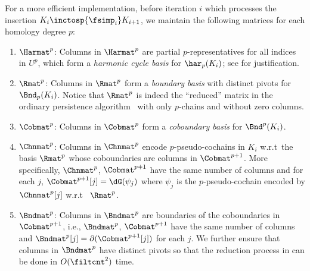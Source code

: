 For a more efficient implementation,
before  iteration $i$ which processes the insertion 
$K_{i}\inctosp{\fsimp_i} K_{i+1}$,
we maintain the following matrices
for each homology degree $p$:
\begin{enumerate}

    \item $\Harmat^{p}$: Columns in  $\Harmat^{p}$
    are
    partial $p$-representatives 
    for all indices in $U^p$,
 which
 form a \emph{harmonic cycle basis} for $\har_p(K_i)$;
 see  for justification.

\item $\Rmat^p$: Columns in $\Rmat^p$ form a \emph{boundary basis} with distinct pivots for $\Bnd_p(K_i)$.
Notice that $\Rmat^p$ is indeed the ``reduced'' matrix 
in the
ordinary persistence algorithm~\cite{cohen2006vines}
with only $p$-chains
and without zero columns.

\item $\Cobmat^p$: Columns in $\Cobmat^p$ form a \emph{coboundary basis}
for $\Bnd^p(K_i)$.


\item 
$\Chnmat^p$: Columns in $\Chnmat^p$
encode $p$-pseudo-cochains in $K_i$ w.r.t\ the basis $\Rmat^p$
whose coboundaries are columns in
$\Cobmat^{p+1}$.
More specifically,
$\Chnmat^p$, $\Cobmat^{p+1}$ have the same number of columns
and for each $j$,
$\Cobmat^{p+1}[j]=\dG(\psi_j)$ 
where $\psi_j$ is the $p$-pseudo-cochain
encoded by $\Chnmat^p[j]$
w.r.t\ 
$\Rmat^p$.

\item $\Bndmat^p$: Columns in $\Bndmat^p$ are boundaries of the
coboundaries in $\Cobmat^{p+1}$,
i.e., 
 $\Bndmat^p$, $\Cobmat^{p+1}$
have the same number of columns and
$\Bndmat^p[j]=\partial(\Cobmat^{p+1}[j])$ for each $j$.
We further ensure that columns in $\Bndmat^p$ have distinct pivots
so that the reduction process in \Cref{algr:reduce} 
can be done in $O(\filtcnt^2)$ time.
\end{enumerate}

